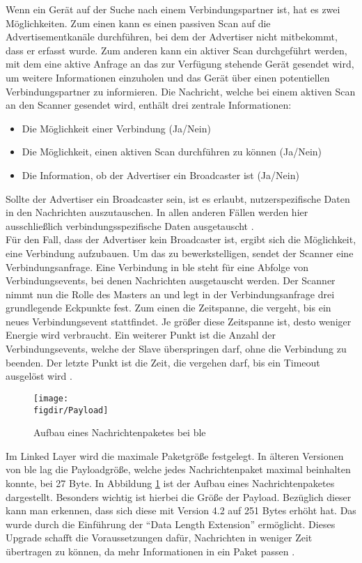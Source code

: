 \noindent Wenn ein Gerät auf der Suche nach einem Verbindungspartner ist, hat es zwei Möglichkeiten. Zum einen kann es einen passiven Scan auf die Advertisementkanäle durchführen, bei dem der Advertiser nicht mitbekommt, dass er erfasst wurde. Zum anderen kann ein aktiver Scan durchgeführt werden, mit dem eine aktive Anfrage an das zur Verfügung stehende Gerät gesendet wird, um weitere Informationen einzuholen und das Gerät über einen potentiellen Verbindungspartner zu informieren. Die Nachricht, welche bei einem aktiven Scan an den Scanner gesendet wird, enthält drei zentrale Informationen:
\begin{itemize}
	\item[1.]{Die Möglichkeit einer Verbindung (Ja/Nein)}
	\item[2.]{Die Möglichkeit, einen aktiven Scan durchführen zu können (Ja/Nein)}
	\item[3.]{Die Information, ob der Advertiser ein Broadcaster ist (Ja/Nein)}
\end{itemize}           
Sollte der Advertiser ein Broadcaster sein, ist es erlaubt, nutzerspezifische Daten in den Nachrichten auszutauschen. In allen anderen Fällen werden hier ausschließlich verbindungsspezifische Daten ausgetauscht \cite[Seite 20f]{Townsend14:GSB}.\\

\noindent Für den Fall, dass der Advertiser kein Broadcaster ist, ergibt sich die Möglichkeit, eine Verbindung aufzubauen. Um das zu bewerkstelligen, sendet der Scanner eine Verbindungsanfrage. Eine Verbindung in \ac{ble} steht für eine Abfolge von Verbindungsevents, bei denen Nachrichten ausgetauscht werden. Der Scanner nimmt nun die Rolle des Masters an und legt in der Verbindungsanfrage drei grundlegende Eckpunkte fest. Zum einen die Zeitspanne, die vergeht, bis ein neues Verbindungsevent stattfindet. Je größer diese Zeitspanne ist, desto weniger Energie wird verbraucht. Ein weiterer Punkt ist die Anzahl der Verbindungsevents, welche der Slave überspringen darf, ohne die Verbindung zu beenden. Der letzte Punkt ist die Zeit, die vergehen darf, bis ein Timeout ausgelöst wird \cite[Seite 21f]{Townsend14:GSB}.\\ 

\begin{figure}[h]
	\centering
	\texttt{[image: \\figdir/Payload]}
	\caption{Aufbau eines Nachrichtenpaketes bei \ac{ble}}
	\label{FIG:payload}
\end{figure}

\noindent Im Linked Layer wird die maximale Paketgröße festgelegt. In älteren Versionen von \ac{ble} lag die Payloadgröße, welche jedes Nachrichtenpaket maximal beinhalten konnte, bei 27 Byte. In Abbildung \ref{FIG:payload} ist der Aufbau eines Nachrichtenpaketes dargestellt. Besonders wichtig ist hierbei die Größe der Payload. Bezüglich dieser kann man erkennen, dass sich diese mit Version 4.2 auf 251 Bytes erhöht hat. Das wurde durch die Einführung der "`Data Length Extension"' ermöglicht. Dieses Upgrade schafft die Voraussetzungen dafür, Nachrichten in weniger Zeit übertragen zu können, da mehr Informationen in ein Paket passen \cite{Gupta:WWW}.\\   

